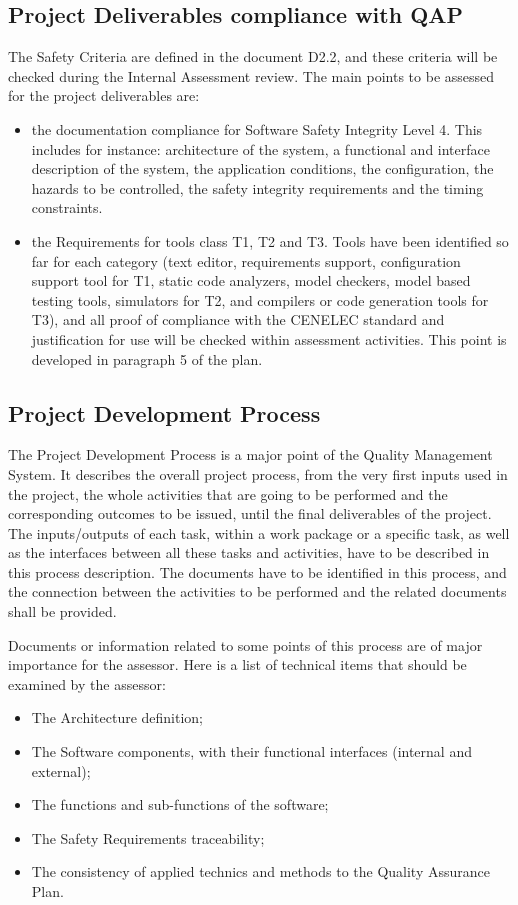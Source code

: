 \documentclass[openetcs]{template/openetcs_article}
\begin{document}
\subsection{Project Deliverables compliance with QAP}
The Safety Criteria are defined in the document D2.2, and these criteria will be checked during the Internal Assessment review. The main points to be assessed
for the project deliverables are:
\begin{itemize}
\item the documentation compliance for Software Safety Integrity Level 4. This includes for instance: architecture of the system, a functional and interface description of the system, the
application conditions, the configuration, the hazards to be controlled, the safety integrity requirements and the timing constraints.
\item the Requirements for tools class T1, T2 and T3. Tools have been identified so far for each category (text editor, requirements support, configuration
support tool for T1, static code analyzers, model checkers, model based testing tools, simulators for T2, and compilers or code generation tools for T3), and
all proof of compliance with the CENELEC standard and justification for use will be checked within assessment activities. This point is developed in
paragraph 5 of the plan.
\end{itemize}

\subsection{Project Development Process}
The Project Development Process is a major point of the Quality Management System. It describes the overall project process, from the very first inputs used in
the project, the whole activities that are going to be performed and the corresponding outcomes to be issued, until the final deliverables of the project. The
inputs/outputs of each task, within a work package or a specific task, as well as the interfaces between all these tasks and activities, have to be described in
this process description.
The documents have to be identified in this process, and the connection  between the activities to be performed and the related documents shall be provided.

Documents or information related to some points of this process are of major importance for the assessor. Here is a list of technical items that should be examined by the assessor:
\begin{itemize}
\item The Architecture definition;
\item The Software components, with their functional interfaces (internal and external);
\item The functions and sub-functions of the software;
\item The Safety Requirements traceability;
\item The consistency of applied technics and methods to the Quality Assurance Plan.
\end{itemize}
\end{document}
